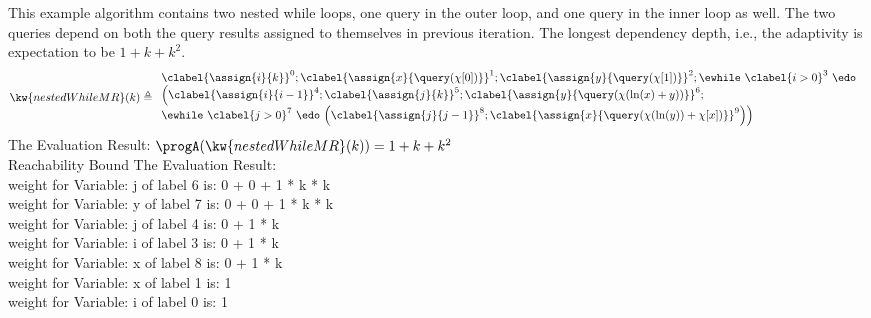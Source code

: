         \begin{example}
            \label{ex:nestedWhileMR}
            This example algorithm contains two nested while loops, one query in the outer loop, and one query in the inner loop as well.
            The two queries depend on both the query results assigned to themselves in previous iteration.
            The longest dependency depth, i.e., the adaptivity is expectation to be $1 + k + k^2 $.
            \[
            \kw{nestedWhileMR}(k) \triangleq 
            \begin{array}{l}
                \clabel{\assign{i}{k} }^{0} ; 
                \clabel{ \assign{x}{\query(\chi[0])}}^{1} ; 
                \clabel{ \assign{y}{\query(\chi[1])}}^{2} ; 
                \ewhile ~ \clabel{i > 0}^{3} ~ \edo ~ \\
                \Big(
                \clabel{\assign{i}{i-1}}^{4} ;
                \clabel{\assign{j}{k}}^{5} ;
                \clabel{\assign{y}{\query(\chi(\ln(x) + y))} }^{6}  ; \\
                \ewhile ~ \clabel{j > 0}^{7} ~ \edo ~ 
                \Big(
                \clabel{\assign{j}{j-1}}^{8};
                \clabel{\assign{x}{\query(\chi(\ln(y))+\chi[x])} }^{9}
                \Big) \Big)
            \end{array}
            \]
            The Evaluation Result: 
            $ \progA(\kw{nestedWhileMR}(k)) = 1 + k + k^2$
            \\
            Reachability Bound The Evaluation Result: \\
            weight for Variable: j of label 6 is: 0 + 0 + 1 * k * k\\
            weight for Variable: y of label 7 is: 0 + 0 + 1 * k * k\\
            weight for Variable: j of label 4 is: 0 + 1 * k\\
            weight for Variable: i of label 3 is: 0 + 1 * k\\
            weight for Variable: x of label 8 is: 0 + 1 * k\\
            weight for Variable: x of label 1 is: 1\\
            weight for Variable: i of label 0 is: 1\\
            \end{example}
